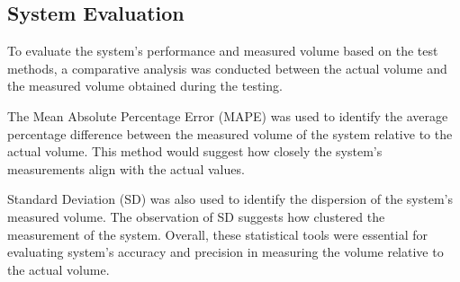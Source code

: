 
\subsection{System Evaluation}
To evaluate the system's performance and measured volume based on the test methods, a comparative analysis was conducted between the actual volume and the measured volume obtained during the testing.

The Mean Absolute Percentage Error (MAPE) was used to identify the average percentage difference between the measured volume of the system relative to the actual volume. This method would suggest how closely the system's measurements align with the actual values.

Standard Deviation (SD) was also used to identify the dispersion of the system's measured volume. The observation of SD suggests how clustered the measurement of the system.  Overall, these statistical tools were essential for evaluating system's accuracy and precision in measuring the volume relative to the actual volume.